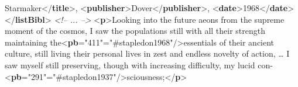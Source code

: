 \begin{reflist}
\begin{shaded}
Starmaker{</\textbf{title}>}, {<\textbf{publisher}>}Dover{</\textbf{publisher}>}, {<\textbf{date}>}1968{</\textbf{date}>}\mbox{}\newline 
{}\mbox{}\newline 
{</\textbf{listBibl}>}\mbox{}\newline 
\textit{<!-- ... -->}\mbox{}\newline 
{<\textbf{p}>}Looking into the future aeons from the supreme moment of\mbox{}\newline 
 the cosmos, I saw the populations still with all their\mbox{}\newline 
 strength maintaining the{<\textbf{pb}\hspace*{1em}{n}="{411}"\hspace*{1em}{edRef}="{\#stapledon1968}"/>}essentials of their ancient culture,\mbox{}\newline 
 still living their personal lives in zest and endless\mbox{}\newline 
 novelty of action, … I saw myself still\mbox{}\newline 
 preserving, though with increasing difficulty, my lucid\mbox{}\newline 
 con-{<\textbf{pb}\hspace*{1em}{n}="{291}"\hspace*{1em}{edRef}="{\#stapledon1937}"/>}sciousness;{</\textbf{p}>}\end{shaded}\egroup 


\end{reflist}  
